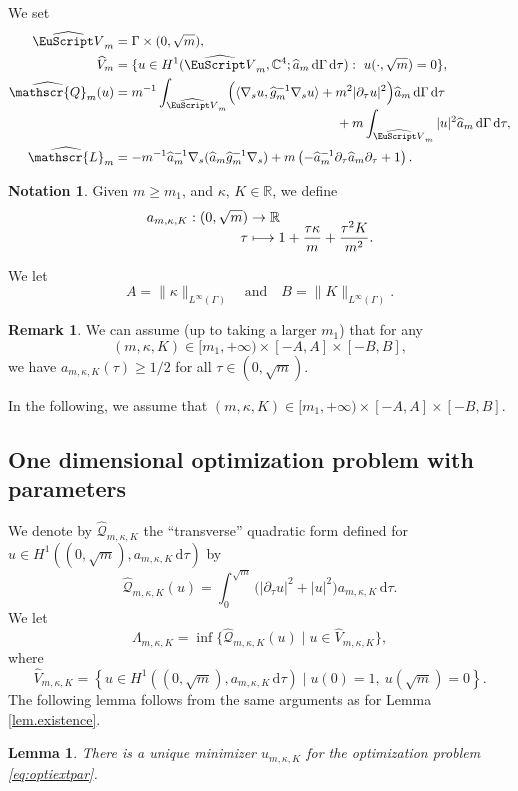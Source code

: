 \documentclass[10pt]{amsart}
\let\mathcal \EuScript
\newcommand\mto{\mathchoice{\longmapsto}{\mapsto}{\mapsto}{\mapsto}}
\newcommand{\scrL}{\mathscr{L}}
\newcommand{\scrQ}{\mathscr{Q}}
\let\sep\mid
\theoremstyle{plain}
\newtheorem{lemma}[theorem]{Lemma}
\theoremstyle{definition}
\newtheorem{notation}[theorem]{Notation}
\newtheorem{remark}[theorem]{Remark}
\newcommand{\RR}{\mathbb{R}}
\newcommand{\CC}{\mathbb{C}}
\newcommand{\dx}{\mathrm{\,d}}
\begin{document}
We set
\begin{equation}\label{eq:dom-hat}
\begin{split}
\widehat{\mathcal V}_{m}&=\Gamma\times(0,\sqrt{m}),\\
\widehat V_{m}&=\{u\in H^1(\widehat{\mathcal V}_{m}, \CC^4;\widehat a_m \dx \Gamma \dx\tau):~u(\cdot,\sqrt{m})=0\},\\
\widehat{\scrQ}_{m}(u)&=m^{-1}\int_{\widehat{\mathcal V}_{m}}\Bigl(\langle\nabla_{s} u,\widehat g^{-1}_m\nabla_{s} u\rangle+m^2|\partial_\tau u|^2\Bigr)\widehat a_m \dx \Gamma \dx\tau\\[-5pt]
&\hspace*{6cm}+m\int_{\widehat{\mathcal V}_{m}}|u|^2\widehat{a}_m\dx \Gamma\dx \tau,\\
\widehat{\scrL}_m&=-m^{-1} \widehat a^{-1}_m\nabla_s(\widehat a_m \widehat g^{-1}_m\nabla_s)
+m\left(-\widehat a^{-1}_m\partial_\tau\widehat a_m\partial_\tau
+1\right).
\end{split}
\end{equation}
\begin{notation}\label{notnation curvatures}
Given $m\geq m_1$, and
$\kappa,\, K\in\RR$, we define
\begin{align*}
a_{m,\kappa,K} : (0,\sqrt{m})& \to \RR \\[-8pt]
\tau&\mto1 + \frac{\tau\kappa}{m} + \frac{\tau^2K}{m^2}.
\end{align*}
\end{notation}
We let
\begin{equation}\label{eq:bcur}
A =\|\kappa\|_{L^\infty(\Gamma)} \quad\text{and}\quad  B = \|K\|_{L^\infty(\Gamma)}.
\end{equation}
\begin{remark}\label{rem:m0}
We can assume (up to taking a larger $m_1$) that for any
\[
(m,\kappa,K)\in[m_1,+\infty)\times[-A,A]\times [-B,B],
\]
we have
$
a_{m,\kappa,K}(\tau)\geq 1/2
$
for all $\tau\in(0,\sqrt{m})$.
\end{remark}
In the following, we assume that $(m,\kappa,K)\in[m_1,+\infty)\times[-A,A]\times [-B,B]$.

\subsection{One dimensional optimization problem with parameters}
We denote by $\widehat{\scrQ}_{m,\kappa,K}$ the \enquote{transverse} quadratic form defined for $u\in H^1((0,\sqrt{m}), a_{m,\kappa,K}\dx\tau)$ by
\[
\widehat{\scrQ}_{m,\kappa,K}(u)
= \int_{0}^{\sqrt{m}}
\big(|\partial_\tau u|^2 + |u|^2\big)a_{m,\kappa,K} \dx\tau.
\]
We let
\begin{equation}\label{eq:optiextpar}
\Lambda_{m,\kappa,K} = \inf\{
\widehat{\scrQ}_{m,\kappa,K}(u) \sep u\in \widehat{V}_{m,\kappa,K}
\},
\end{equation}
where
\[
\widehat{V}_{m,\kappa,K} = \left\{
u \in H^1((0,\sqrt{m}), a_{m,\kappa,K}\dx\tau)\sep u(0) = 1, \ u(\sqrt{m})=0
\right\}.
\]
The following lemma follows from the same arguments as for Lemma \ref{lem.existence}.
\begin{lemma}\label{unique minim 1d}
There is a unique minimizer $u_{m,\kappa,K}$ for the optimization problem \eqref{eq:optiextpar}.
\end{lemma}
\end{document}
